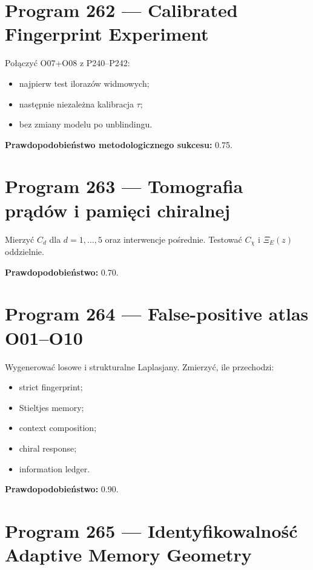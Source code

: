\documentclass[11pt,a4paper,openany]{report}
\begin{document}
\section{Program 262 --- Calibrated Fingerprint Experiment}

Połączyć O07+O08 z P240--P242:

\begin{itemize}
\item 
najpierw test ilorazów widmowych;

\item 
następnie niezale\.zna kalibracja \(\tau\);

\item 
bez zmiany modelu po unblindingu.

\end{itemize}

\textbf{Prawdopodobieństwo metodologicznego sukcesu:} 0.75.

\section{Program 263 --- Tomografia prądów i pamięci chiralnej}

Mierzyć \(C_d\) dla \(d=1,\ldots,5\) oraz interwencje pośrednie. Testować \(C_\chi\) i \(\Xi_E(z)\) oddzielnie.

\textbf{Prawdopodobieństwo:} 0.70.

\section{Program 264 --- False-positive atlas O01--O10}

Wygenerować losowe i strukturalne Laplasjany. Zmierzyć, ile przechodzi:

\begin{itemize}
\item 
strict fingerprint;

\item 
Stieltjes memory;

\item 
context composition;

\item 
chiral response;

\item 
information ledger.

\end{itemize}

\textbf{Prawdopodobieństwo:} 0.90.

\section{Program 265 --- Identyfikowalność Adaptive Memory Geometry}
\end{document}
